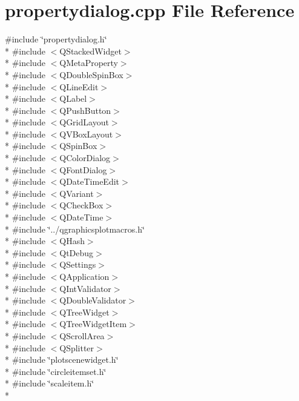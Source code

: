 \section{propertydialog.\+cpp File Reference}
\label{properties_2propertydialog_8cpp}
{\ttfamily \#include \char`\"{}propertydialog.\+h\char`\"{}}\\*
{\ttfamily \#include $<$Q\+Stacked\+Widget$>$}\\*
{\ttfamily \#include $<$Q\+Meta\+Property$>$}\\*
{\ttfamily \#include $<$Q\+Double\+Spin\+Box$>$}\\*
{\ttfamily \#include $<$Q\+Line\+Edit$>$}\\*
{\ttfamily \#include $<$Q\+Label$>$}\\*
{\ttfamily \#include $<$Q\+Push\+Button$>$}\\*
{\ttfamily \#include $<$Q\+Grid\+Layout$>$}\\*
{\ttfamily \#include $<$Q\+V\+Box\+Layout$>$}\\*
{\ttfamily \#include $<$Q\+Spin\+Box$>$}\\*
{\ttfamily \#include $<$Q\+Color\+Dialog$>$}\\*
{\ttfamily \#include $<$Q\+Font\+Dialog$>$}\\*
{\ttfamily \#include $<$Q\+Date\+Time\+Edit$>$}\\*
{\ttfamily \#include $<$Q\+Variant$>$}\\*
{\ttfamily \#include $<$Q\+Check\+Box$>$}\\*
{\ttfamily \#include $<$Q\+Date\+Time$>$}\\*
{\ttfamily \#include \char`\"{}../qgraphicsplotmacros.\+h\char`\"{}}\\*
{\ttfamily \#include $<$Q\+Hash$>$}\\*
{\ttfamily \#include $<$Qt\+Debug$>$}\\*
{\ttfamily \#include $<$Q\+Settings$>$}\\*
{\ttfamily \#include $<$Q\+Application$>$}\\*
{\ttfamily \#include $<$Q\+Int\+Validator$>$}\\*
{\ttfamily \#include $<$Q\+Double\+Validator$>$}\\*
{\ttfamily \#include $<$Q\+Tree\+Widget$>$}\\*
{\ttfamily \#include $<$Q\+Tree\+Widget\+Item$>$}\\*
{\ttfamily \#include $<$Q\+Scroll\+Area$>$}\\*
{\ttfamily \#include $<$Q\+Splitter$>$}\\*
{\ttfamily \#include \char`\"{}plotscenewidget.\+h\char`\"{}}\\*
{\ttfamily \#include \char`\"{}circleitemset.\+h\char`\"{}}\\*
{\ttfamily \#include \char`\"{}scaleitem.\+h\char`\"{}}\\*

